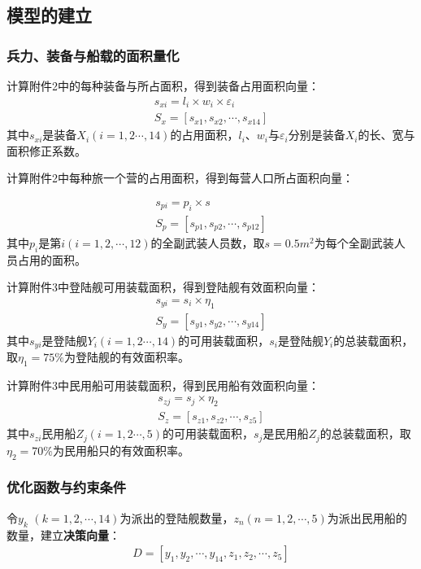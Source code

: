 \documentclass{whutmod}
\begin{document}
	    \subsection{模型的建立}
	    \subsubsection{兵力、装备与船载的面积量化}


	    计算附件2中的每种装备与所占面积，得到装备占用面积向量：
	    \begin{gather*}
	    s_{xi}=l_{i}\times w_{i} \times \varepsilon _{i}\\
	        S_{x}=[s_{x1},s_{x2},\cdots,s_{x14}]
	    \end{gather*}
	    其中$s_{xi}$是装备$X_{i}(i=1,2\cdots,14)$的占用面积，$l_{i}$、$w_{i}$与$\varepsilon _{i}$分别是装备$X_{i}$的长、宽与面积修正系数。
	    
	     计算附件2中每种旅一个营的占用面积，得到每营人口所占面积向量：


	     \begin{gather*}
	     s_{pi}=p_{i}\times s\\
	     S_{p}=[s_{p1},s_{p2},\cdots,s_{p12}]
	     \end{gather*}
	     其中$p_{i}$是第$i(i=1,2,\cdots,12)$的全副武装人员数，取$s=0.5m^2$为每个全副武装人员占用的面积。
	     
	     计算附件3中登陆舰可用装载面积，得到登陆舰有效面积向量：
	      \begin{gather*}
	      s_{yi}=s_{i}\times \eta_{1}\\
	      S_{y}=[s_{y1},s_{y2},\cdots,s_{y14}]
	      \end{gather*}
	    其中$s_{yi}$是登陆舰$Y_{i}(i=1,2\cdots,14)$的可用装载面积，$s_{i}$是登陆舰$Y_{i}$的总装载面积，取$\eta_{1}=75\%$为登陆舰的有效面积率。
	    
	    计算附件3中民用船可用装载面积，得到民用船有效面积向量：
	      \begin{gather*}
	      s_{zj}=s_{j}\times \eta_{2}\\
	      S_{z}=[s_{z1},s_{z2},\cdots,s_{z5}]
	      \end{gather*}
	       其中$s_{zi}$民用船$Z_{j}(i=1,2\cdots,5)$的可用装载面积，$s_{j}$是民用船$Z_{j}$的总装载面积，取$\eta_{2}=70\%$为民用船只的有效面积率。
	    \subsubsection{优化函数与约束条件}
	    令$y_{k} $ $(k=1,2,\cdots ,14)$为派出的登陆舰数量，$z_{n}$$(n=1,2,\cdots ,5)$为派出民用船的数量，建立\textbf{决策向量}：
	     \begin{gather*}
	     D=[y_{1},y_{2},\cdots,y_{14},z_{1},z_{2},\cdots,z_{5}]
	    \end{gather*}
	    
\end{document}
